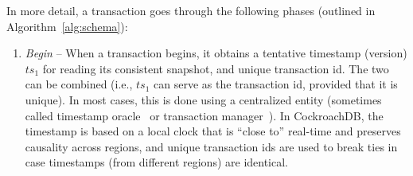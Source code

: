 
In more detail, a transaction goes through the following phases (outlined in Algorithm~\ref{alg:schema}):
\begin{enumerate}
  \item \emph{Begin} -- 
  When a transaction begins, it obtains a tentative timestamp (version) $ts_1$ for reading its consistent snapshot, and unique transaction id.
  The two can be combined (i.e., $ts_1$ can serve as the  transaction id, provided that it is unique).
  In most cases, this is done using a centralized entity (sometimes called timestamp oracle~\cite{Percolator2010,OmidICDE2014}
   or transaction manager~\cite{omid-blog}). 
  In CockroachDB, the timestamp is based on a local clock that is ``close to'' real-time and preserves causality 
  across regions, and unique transaction ids are used to break ties in case timestamps (from different regions) are identical. 


\end{enumerate}

